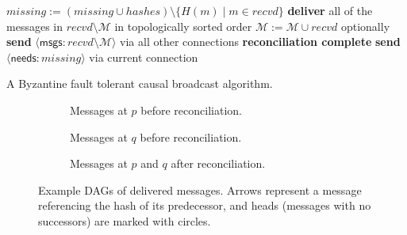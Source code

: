 \documentclass[a4paper,anonymous,USenglish]{lipics-v2019}
\begin{document}
\begin{algorithm}
\begin{algorithmic}[1]
    \EndOn\label{line:end-needs}
    \State
        \State $\mathit{missing} := (\mathit{missing} \cup \mathit{hashes}) \setminus \{H(m) \mid m \in \mathit{recvd}\}$
         \label{line:missing-empty}
            \State \textbf{deliver} all of the messages in $\mathit{recvd} \setminus \mathcal{M}$ in topologically sorted order\label{line:deliver}
            \State $\mathcal{M} := \mathcal{M} \cup \mathit{recvd}$ \label{line:update-m}
            \State optionally \textbf{send} $\langle\mathsf{msgs}: \mathit{recvd} \setminus \mathcal{M}\rangle$ via all other connections\label{line:eager-relay}
            \State \textbf{reconciliation complete} \label{line:finish}
        \Else
            \State \textbf{send} $\langle\mathsf{needs}: \mathit{missing}\rangle$ via current connection \label{line:send-missing}
        \EndIf
    \EndFunction
    \end{algorithmic}
    \caption{A Byzantine fault tolerant causal broadcast algorithm.}\label{fig:algorithm}
\end{algorithm}

\begin{figure}
    \centering
    \begin{subfigure}[b]{0.35\textwidth}
    \centering
    \hspace{0.5cm}
    \captionsetup{width=.9\linewidth}
    \caption{Messages at $p$ before reconciliation.}
    \end{subfigure}%
    \begin{subfigure}[b]{0.26\textwidth}
    \centering
    \hspace{0.5cm}
    \captionsetup{width=.9\linewidth}
    \caption{Messages at $q$ before reconciliation.}
    \end{subfigure}%
    \begin{subfigure}[b]{0.35\textwidth}
    \centering
    
    \captionsetup{width=.9\linewidth}
    \caption{Messages at $p$ and $q$ after reconciliation.}
    \end{subfigure}
    \caption{Example DAGs of delivered messages. Arrows represent a message referencing the hash of its predecessor, and heads (messages with no successors) are marked with circles.}
    \label{fig:example-dags}
\end{figure}
\end{document}
